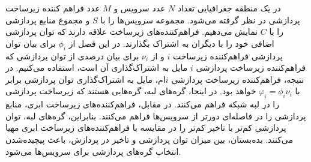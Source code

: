     در یک منطقه جغرافیایی تعداد $N$ عدد سرویس و $M$ عدد فراهم کننده زیرساخت پردازشی در نظر گرفته می‌شود.
    مجموعه سرویس‌ها را با $S$ و مجموع منابع پردازشی را با $C$ نمایش می‌دهیم.
    فراهم‌کننده‌های زیرساخت علاقه دارند که توان پردازشی اضافی خود را با دیگران به اشتراک بگذارند.
    در این فصل از $\phi_i$ برای بیان توان پردازشی فراهم‌کننده زیرساخت $i$ و از $\nu_i$ برای بیان درصدی از توان پردازشی که فراهم‌کننده زیرساخت پردازشی $i$ مایل به اشتراک‌گذاری آن است، استفاده می‌کنیم.
    در نتیجه، فراهم‌کننده زیرساخت پردازشی $i$ام، مایل به اشتراک‌گذاری توان پردازشی برابر با $\varphi_i = \phi_i \nu_i$ خواهد بود.
    در اینجا، گره‌های لبه، گره‌هایی هستند که زیرساخت پردازشی را در لبه شبکه فراهم می‌کنند.
    در مقابل، فراهم‌کننده‌های زیرساخت ابری، منابع پردازشی را در فاصله‌ای دورتر از سرویس‌ها فراهم می‌کنند.
    بنابراین،‌ گره‌های لبه، توان پردازشی کم‌تر با تاخیر کم‌تر را در مقایسه با فراهم‌کننده‌های زیرساخت ابری مهیا می‌کنند.
    بده‌بستان، بین میزان توان پردازشی و تاخیر در پردازش، باعث پیچیده‌شدن انتخاب گره‌های پردازشی برای سرویس‌ها می‌شود.
    
